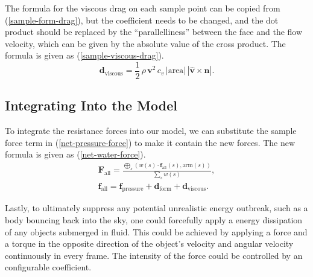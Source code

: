 The formula for the viscous drag on each sample point can be copied from (\ref{sample-form-drag}), but the coefficient needs to be changed, and the dot product should be replaced by the ``parallelliness'' between the face and the flow velocity, which can be given by the absolute value of the cross product.
The formula is given as (\ref{sample-viscous-drag}).
\begin{equation}
	\mathbf{d}_{\text{viscous}}=\frac{1}{2}\,\rho\,\mathbf{v}^2\,c_v\,|\text{area}|\,|\hat{\mathbf{v}}\times\mathbf{n}|.
	\label{sample-viscous-drag}
\end{equation}

\subsection{Integrating Into the Model}

To integrate the resistance forces into our model, we can substitute the sample force term in (\ref{net-pressure-force}) to make it contain the new forces.
The new formula is given as (\ref{net-water-force}).
\begin{equation}\begin{split}
	\mathbf{F}_{\text{all}}=\frac
		{
			\bigoplus_{s}
			\left(
				w(s)\cdot\mathbf{f}_{\text{all}}(s)
				,
				\text{arm}(s)
			\right)
		}
		{\sum_{s}w(s)},
	\\
	\mathbf{f}_{\text{all}}=\mathbf{f}_{\text{pressure}}+\mathbf{d}_{\text{form}}+\mathbf{d}_{\text{viscous}}.
	\label{net-water-force}
\end{split}\end{equation}

Lastly, to ultimately suppress any potential unrealistic energy outbreak, such as a body bouncing back into the sky, one could forcefully apply a energy dissipation of any objects submerged in fluid.
This could be achieved by applying a force and a torque in the opposite direction of the object's velocity and angular velocity continuously in every frame.
The intensity of the force could be controlled by an configurable coefficient.